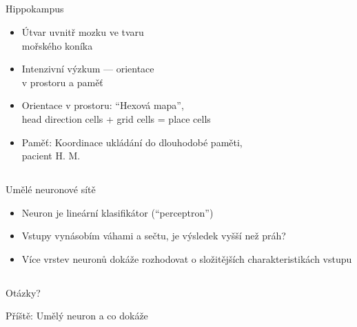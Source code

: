 \documentclass{beamer}
\begin{document}
\subsection{}
\begin{frame}{Hippokampus}
\begin{itemize}
\item Útvar uvnitř mozku ve tvaru \\ mořského koníka
\item Intenzivní výzkum --- orientace \\ v prostoru a paměť
\item Orientace v prostoru: ``Hexová mapa'',\\ head direction cells + grid cells = place cells
\item Paměť: Koordinace ukládání do dlouhodobé paměti,\\ pacient H. M.
\end{itemize}
\end{frame}

\subsection{}
\begin{frame}{Umělé neuronové sítě}
\begin{itemize}
\item Neuron je lineární klasifikátor (``perceptron'')
\item Vstupy vynásobím váhami a sečtu, je výsledek vyšší než práh?
\item Více vrstev neuronů dokáže rozhodovat o složitějších charakteristikách vstupu
\end{itemize}
\end{frame}

\subsection{}
\begin{frame}{Otázky?}
\begin{center}
Příště: Umělý neuron a co dokáže
\end{center}
\end{frame}
\end{document}
